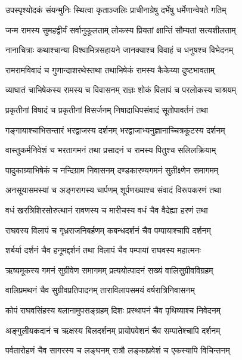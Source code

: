 \twolineshloka
{उपस्पृश्योदकं संयन्मुनिः स्थित्वा कृताञ्जलिः}
{प्राचीनाग्रेषु दर्भेषु धर्मेणान्वेषते गतिम्} %

\twolineshloka
{जन्म रामस्य सुमहद्वीर्यं सर्वानुकूलताम्}
{लोकस्य प्रियतां क्षान्तिं सौम्यतां सत्यशीलताम्} %

\twolineshloka
{नानाचित्राः कथाश्चान्या विश्वामित्रसहायने}
{जानक्याश्च विवाहं च धनुषश्च विभेदनम्} %

\twolineshloka
{रामरामविवादं च गुणान्दाशरथेस्तथा}
{तथाभिषेकं रामस्य कैकेय्या दुष्टभावताम्} %

\twolineshloka
{व्याघातं चाभिषेकस्य रामस्य च विवासनम्}
{राज्ञः शोकं विलापं च परलोकस्य चाश्रयम्} %

\twolineshloka
{प्रकृतीनां विषादं च प्रकृतीनां विसर्जनम्}
{निषादाधिपसंवादं सूतोपावर्तनं तथा} %

\twolineshloka
{गङ्गायाश्चाभिसन्तारं भरद्वाजस्य दर्शनम्}
{भरद्वाजाभ्यनुज्ञानाच्चित्रकूटस्य दर्शनम्} %

\twolineshloka
{वास्तुकर्मनिवेशं च भरतागमनं तथा}
{प्रसादनं च रामस्य पितुश्च सलिलक्रियाम्} %

\twolineshloka
{पादुकाग्र्याभिषेकं च नन्दिग्राम निवासनम्}
{दण्डकारण्यगमनं सुतीक्ष्णेन समागमम्} %

\twolineshloka
{अनसूयासमस्यां च अङ्गरागस्य चार्पणम्}
{शूर्पणख्याश्च संवादं विरूपकरणं तथा} %

\twolineshloka
{वधं खरत्रिशिरसोरुत्थानं रावणस्य च}
{मारीचस्य वधं चैव वैदेह्या हरणं तथा} %

\twolineshloka
{राघवस्य विलापं च गृध्रराजनिबर्हणम्}
{कबन्धदर्शनं चैव पम्पायाश्चापि दर्शनम्} %

\twolineshloka
{शर्बर्या दर्शनं चैव हनूमद्दर्शनं तथा}
{विलापं चैव पम्पायां राघवस्य महात्मनः} %

\twolineshloka
{ऋष्यमूकस्य गमनं सुग्रीवेण समागमम्}
{प्रत्ययोत्पादनं सख्यं वालिसुग्रीवविग्रहम्} %

\twolineshloka
{वालिप्रमथनं चैव सुग्रीवप्रतिपादनम्}
{ताराविलापसमयं वर्षरात्रिनिवासनम्} %

\twolineshloka
{कोपं राघवसिंहस्य बलानामुपसङ्ग्रहम्}
{दिशः प्रस्थापनं चैव पृथिव्याश्च निवेदनम्} %

\twolineshloka
{अङ्गुलीयकदानं च ऋक्षस्य बिलदर्शनम्}
{प्रायोपवेशनं चैव सम्पातेश्चापि दर्शनम्} %

\twolineshloka
{पर्वतारोहणं चैव सागरस्य च लङ्घनम्}
{रात्रौ लङ्काप्रवेशं च एकस्यापि विचिन्तनम्} %

